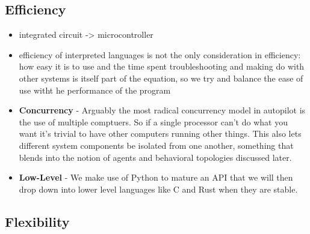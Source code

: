 \subsection{Efficiency}

\begin{itemize}
\item integrated circuit -> microcontroller
\item efficiency of interpreted languages is not the only consideration in efficiency: how easy it is to use and the time spent troubleshooting and making do with other systems is itself part of the equation, so we try and balance the ease of use witht he performance of the program 
\item \textbf{Concurrency} - Arguably the most radical concurrency model in autopilot is the use of multiple comptuers. So if a single processor can't do what you want it's trivial to have other computers running other things. This also lets different system components be isolated from one another, something that blends into the notion of agents and behavioral topologies discussed later.
\item \textbf{Low-Level} - We make use of Python to mature an API that we will then drop down into lower level languages like C and Rust when they are stable.
\end{itemize}

\subsection{Flexibility}


